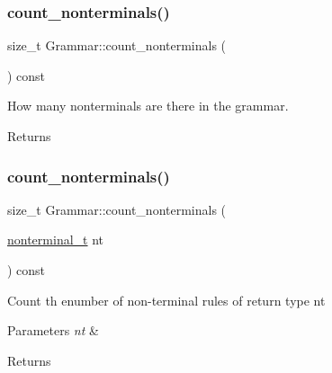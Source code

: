 \mbox{\label{class_grammar_abf841bc64ac19cb9872a8362f5e5731a}} 
\subsubsection{\texorpdfstring{count\+\_\+nonterminals()}{count\_nonterminals()}\hspace{0.1cm}{\footnotesize\ttfamily [1/2]}}
{\footnotesize\ttfamily size\+\_\+t Grammar\+::count\+\_\+nonterminals (\begin{DoxyParamCaption}{ }\end{DoxyParamCaption}) const\hspace{0.3cm}{\ttfamily [inline]}}

How many nonterminals are there in the grammar. \begin{DoxyReturn}{Returns}

\end{DoxyReturn}
\mbox{\label{class_grammar_a0714d68070749932d876fe868bde94bd}} 
\subsubsection{\texorpdfstring{count\+\_\+nonterminals()}{count\_nonterminals()}\hspace{0.1cm}{\footnotesize\ttfamily [2/2]}}
{\footnotesize\ttfamily size\+\_\+t Grammar\+::count\+\_\+nonterminals (\begin{DoxyParamCaption}\item[{\hyperlink{_nonterminal_8h_a5c1f658dc7560600a16d22408bd716ca}{nonterminal\+\_\+t}}]{nt }\end{DoxyParamCaption}) const\hspace{0.3cm}{\ttfamily [inline]}}

Count th enumber of non-\/terminal rules of return type nt 
\begin{DoxyParams}{Parameters}
{\em nt} & \\
\hline
\end{DoxyParams}
\begin{DoxyReturn}{Returns}

\end{DoxyReturn}
\mbox{\label{class_grammar_af25c47a2c5cae2a11720c8454e59290f}} 

